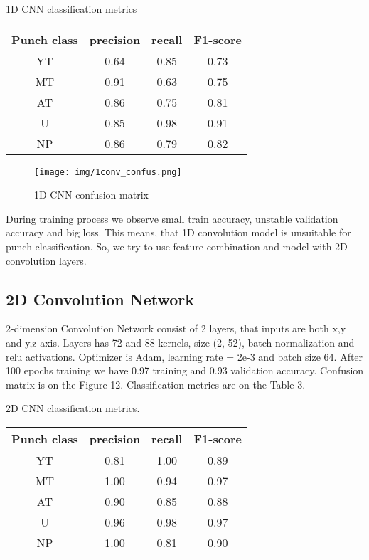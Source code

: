 \documentclass[sport,article,submit,moreauthors,pdftex]{Definitions/mdpi}
\begin{document}
\begin{specialtable}[H]
\caption{1D CNN classification metrics\label{tab2}}
\begin{tabular}{cccc}
\toprule
\textbf{Punch class}	& \textbf{precision}	& \textbf{recall}	& \textbf{F1-score}\\
\midrule
YT		& 0.64		& 0.85		& 0.73 \\
MT		& 0.91		& 0.63		& 0.75 \\
AT		& 0.86		& 0.75		& 0.81 \\
U		& 0.85		& 0.98		& 0.91 \\
NP		& 0.86		& 0.79		& 0.82 \\
\bottomrule
\end{tabular}
\end{specialtable}

\begin{figure}[H]
\texttt{[image: img/1conv\_confus.png]}
\caption{1D CNN confusion matrix}
\end{figure}

During training process we observe small train accuracy, unstable validation accuracy and big loss. This means, that 1D convolution model is unsuitable for punch classification.
So, we try to use feature combination and model with 2D convolution layers.


\subsection{2D Convolution Network}
2-dimension Convolution Network consist of 2 layers, that inputs are both x,y and y,z axis. Layers has  72 and 88 kernels, size (2, 52), batch normalization and relu activations.
Optimizer is Adam, learning rate = 2e-3 and batch size 64.
After 100 epochs training we have 0.97 training and 0.93 validation accuracy. Confusion matrix is on the Figure 12. Classification metrics are on the Table 3.

\begin{specialtable}[H]
\caption{2D CNN classification metrics.\label{tab3}}
\begin{tabular}{cccc}
\toprule
\textbf{Punch class}	&\textbf{precision}	& \textbf{recall}	& \textbf{F1-score}\\
\midrule
YT		& 0.81		& 1.00		& 0.89 \\
MT		& 1.00		& 0.94		& 0.97 \\
AT		& 0.90		& 0.85		& 0.88 \\
U		& 0.96		& 0.98		& 0.97 \\
NP		& 1.00		& 0.81		& 0.90 \\
\bottomrule
\end{tabular}
\end{specialtable}
\end{document}
